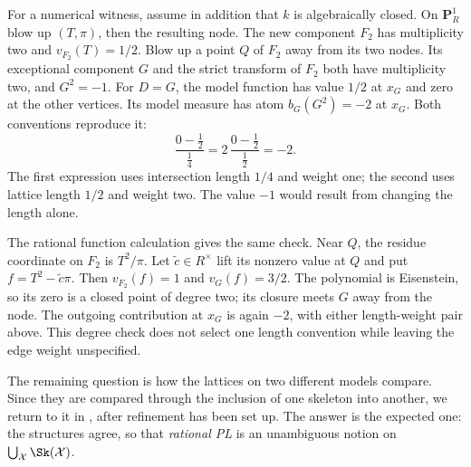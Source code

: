 \begin{remark}
For a numerical witness, assume in addition that $k$ is
algebraically closed.  On $\mathbf P^1_R$ blow up $(T,\pi)$,
then the resulting node.  The new component $F_2$ has
multiplicity two and $v_{F_2}(T)=1/2$.
Blow up a point $Q$ of $F_2$ away from its two nodes.
Its exceptional component $G$ and the strict transform of $F_2$
both have multiplicity two, and $G^2=-1$.
For $D=G$, the model function has value $1/2$ at $x_G$ and
zero at the other vertices.  Its model measure has atom
$b_G(G^2)=-2$ at $x_G$.  Both conventions reproduce it:
\[
       \frac{0-\tfrac12}{\tfrac14}
               =2\,\frac{0-\tfrac12}{\tfrac12}
               =-2 .
\]
The first expression uses intersection length $1/4$ and weight
one; the second uses lattice length $1/2$ and weight two.
The value $-1$ would result from changing the length alone.

The rational function calculation gives the same check.
Near $Q$, the residue coordinate on $F_2$ is $T^2/\pi$.
Let $\tilde c\in R^\times$ lift its nonzero value at $Q$ and put
$f=T^2-\tilde c\pi$.  Then
$v_{F_2}(f)=1$ and $v_G(f)=3/2$.
The polynomial is Eisenstein, so its zero is a closed point of
degree two; its closure meets $G$ away from the node.
The outgoing contribution at $x_G$ is again $-2$, with either
length-weight pair above.  This degree check does not select
one length convention while leaving the edge weight unspecified.
\end{remark}

The remaining question is how the lattices on two different models compare.
Since they are compared through the inclusion of one skeleton into another,
we return to it in , after refinement
has been set up. The answer is the expected one: the structures agree, so
that \emph{rational PL} is an unambiguous notion on
$\bigcup_{\mathcal X}\Sk(\mathcal X)$.

